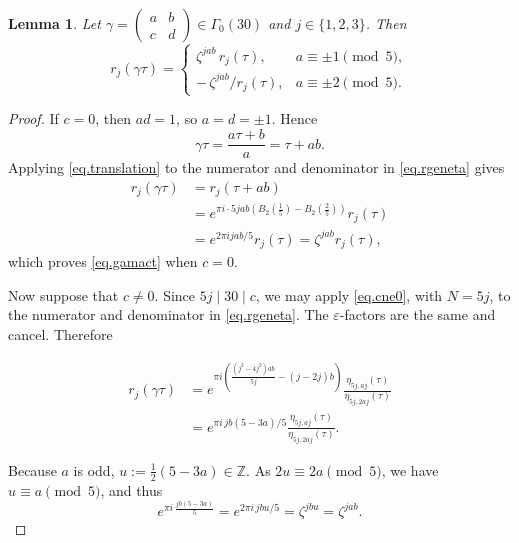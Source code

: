 \documentclass{amsart}
\newtheorem{lemma}[theorem]{Lemma}
\theoremstyle{definition}
\newcommand{\smat}[4]{\left(\begin{smallmatrix}#1&#2\\#3&#4\end{smallmatrix}\right)}
\begin{document}
{{\begin{lemma}\label{lem.transform}
Let $\gamma=\smat abcd\in\Gamma_{0}(30)$ and $j\in\{1,2,3\}$.  Then
\begin{equation}\label{eq.gamact}
r_{j}(\gamma\tau)=
\begin{cases}
\zeta^{jab}\,r_{j}(\tau), & a\equiv\pm1\pmod5,\\[3pt]
-\,\zeta^{jab}\big/r_{j}(\tau), & a\equiv\pm2\pmod5.
\end{cases}
\end{equation}
\end{lemma}

\begin{proof}
If $c=0$, then $ad=1$, so $a=d=\pm1$.  Hence
\begin{equation*}
\gamma\tau=\frac{a\tau+b}{a}=\tau+ab.
\end{equation*}
Applying \eqref{eq.translation} to the
numerator and denominator in \eqref{eq.rgeneta} gives
\begin{equation*}
\begin{aligned}
r_{j}(\gamma\tau)
&=r_{j}(\tau+ab)\\
&=e^{\pi i\cdot5jab
\left(B_{2}(\frac15)-B_{2}(\frac25)\right)}r_{j}(\tau)\\
&=e^{2\pi ijab/5}r_{j}(\tau)
=\zeta^{jab}r_{j}(\tau),
\end{aligned}
\end{equation*}
which proves \eqref{eq.gamact} when $c=0$.

Now suppose that $c\ne0$. 
Since $5j\mid30\mid c$,  we may apply \eqref{eq.cne0}, with  $N=5j$, to the
numerator and denominator in \eqref{eq.rgeneta}.  The
$\varepsilon$-factors are the same and cancel.  Therefore

\begin{equation}\label{eq.transformraw}
\begin{aligned}
r_{j}(\gamma\tau)
&=
e^{\pi i\left(
\frac{(j^{2}-4j^{2})ab}{5j}-(j-2j)b
\right)}
\frac{\eta_{5j,aj}(\tau)}
{\eta_{5j,2aj}(\tau)}\\
&=
e^{\pi i\,jb(5-3a)/5}
\frac{\eta_{5j,aj}(\tau)}
{\eta_{5j,2aj}(\tau)}.
\end{aligned}
\end{equation}

Because $a$ is odd, $u:=\tfrac12(5-3a)\in\mathbb{Z}$.  As
$2u\equiv2a\pmod5$, we have $u\equiv a\pmod5$, and thus
\begin{equation}
e^{\pi i\,\frac{jb(5-3a)}{5}}=e^{2\pi i\,jbu/5}=\zeta^{jbu}=\zeta^{jab}.
\label{eq.expuniform}
\end{equation}


\end{proof}}}
\end{document}
